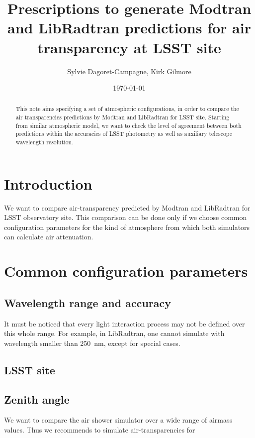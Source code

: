 \documentclass[a4paper]{article}
\title{Prescriptions to generate Modtran and LibRadtran predictions for air transparency at LSST site}
\author{Sylvie Dagoret-Campagne, Kirk Gilmore}
\date{\today}
\begin{document}
\maketitle

\begin{abstract}
This note aims specifying a set of atmospheric configurations, in order to compare the air transparencies predictions  by Modtran and LibRadtran for LSST site.
Starting from similar atmospheric model, we want to check the level of agreement between both predictions within
the accuracies of LSST photometry as well as auxiliary telescope wavelength resolution. 
\end{abstract}

\section{Introduction}
\label{sec:introduction}
We want to compare air-transparency predicted by Modtran and LibRadtran for LSST observatory site.
This comparison can be done only if we choose common configuration parameters for the kind of atmosphere  from which both simulators can calculate air attenuation.

\section{Common configuration parameters}


\subsection{Wavelength range and accuracy}

It must be noticed that every light interaction process may not be defined over this whole range. For example, in LibRadtran, one cannot simulate with wavelength smaller than 250~nm, except for special cases. 

\subsection{LSST site}

\subsection{Zenith angle}
We want to compare the air shower simulator over a wide range of airmass values. Thus we recommends to  simulate air-transparencies for  
\end{document}
